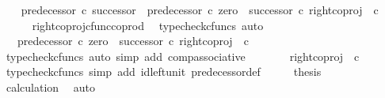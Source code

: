 \begin{isabellebody}
\ \ \isamarkupfalse%
\ {\isachardoublequoteopen}predecessor\ {\isasymcirc}\isactrlsub c\ successor\ {\isacharequal}{\kern0pt}\ predecessor\ {\isasymcirc}\isactrlsub c\ {\isacharparenleft}{\kern0pt}zero\ {\isasymamalg}\ successor{\isacharparenright}{\kern0pt}\ {\isasymcirc}\isactrlsub c\ right{\isacharunderscore}{\kern0pt}coproj\ {\isasymone}\ {\isasymnat}\isactrlsub c{\isachardoublequoteclose}\isanewline
\ \ \ \ \isamarkupfalse%
\ right{\isacharunderscore}{\kern0pt}coproj{\isacharunderscore}{\kern0pt}cfunc{\isacharunderscore}{\kern0pt}coprod\ \isamarkupfalse%
\ {\isacharparenleft}{\kern0pt}typecheck{\isacharunderscore}{\kern0pt}cfuncs{\isacharcomma}{\kern0pt}\ auto{\isacharparenright}{\kern0pt}\isanewline
\ \ \isamarkupfalse%
\ \isamarkupfalse%
\ {\isachardoublequoteopen}{\isachardot}{\kern0pt}{\isachardot}{\kern0pt}{\isachardot}{\kern0pt}\ {\isacharequal}{\kern0pt}\ {\isacharparenleft}{\kern0pt}predecessor\ {\isasymcirc}\isactrlsub c\ {\isacharparenleft}{\kern0pt}zero\ {\isasymamalg}\ successor{\isacharparenright}{\kern0pt}{\isacharparenright}{\kern0pt}\ {\isasymcirc}\isactrlsub c\ right{\isacharunderscore}{\kern0pt}coproj\ {\isasymone}\ {\isasymnat}\isactrlsub c{\isachardoublequoteclose}\isanewline
\ \ \ \ \isamarkupfalse%
\ {\isacharparenleft}{\kern0pt}typecheck{\isacharunderscore}{\kern0pt}cfuncs{\isacharcomma}{\kern0pt}\ auto\ simp\ add{\isacharcolon}{\kern0pt}\ comp{\isacharunderscore}{\kern0pt}associative{}{\isacharparenright}{\kern0pt}\isanewline
\ \ \isamarkupfalse%
\ \isamarkupfalse%
\ {\isachardoublequoteopen}{\isachardot}{\kern0pt}{\isachardot}{\kern0pt}{\isachardot}{\kern0pt}\ {\isacharequal}{\kern0pt}\ right{\isacharunderscore}{\kern0pt}coproj\ {\isasymone}\ {\isasymnat}\isactrlsub c{\isachardoublequoteclose}\isanewline
\ \ \ \ \isamarkupfalse%
\ {\isacharparenleft}{\kern0pt}typecheck{\isacharunderscore}{\kern0pt}cfuncs{\isacharcomma}{\kern0pt}\ simp\ add{\isacharcolon}{\kern0pt}\ id{\isacharunderscore}{\kern0pt}left{\isacharunderscore}{\kern0pt}unit{}\ predecessor{\isacharunderscore}{\kern0pt}def{}{\isacharparenright}{\kern0pt}\isanewline
\ \ \isamarkupfalse%
\ \isamarkupfalse%
\ {\isacharquery}{\kern0pt}thesis\isanewline
\ \ \ \ \isamarkupfalse%
\ calculation\ \isamarkupfalse%
\ auto\isanewline
{}\isamarkupfalse%
%
\endisatagproof
{\isafoldproof}%
%
\isadelimproof
\isanewline
%

\end{isabellebody}
